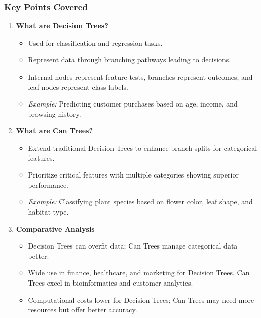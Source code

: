 \documentclass[aspectratio=169]{beamer}
\begin{document}
\begin{frame}[fragile]
    \frametitle{Key Points Covered}
    \begin{enumerate}
        \item \textbf{What are Decision Trees?}
            \begin{itemize}
                \item Used for classification and regression tasks.
                \item Represent data through branching pathways leading to decisions.
                \item Internal nodes represent feature tests, branches represent outcomes, and leaf nodes represent class labels.
                \item \textit{Example:} Predicting customer purchases based on age, income, and browsing history.
            \end{itemize}
        
        \item \textbf{What are Can Trees?}
            \begin{itemize}
                \item Extend traditional Decision Trees to enhance branch splits for categorical features.
                \item Prioritize critical features with multiple categories showing superior performance.
                \item \textit{Example:} Classifying plant species based on flower color, leaf shape, and habitat type.
            \end{itemize}

        \item \textbf{Comparative Analysis}
            \begin{itemize}
                \item Decision Trees can overfit data; Can Trees manage categorical data better.
                \item Wide use in finance, healthcare, and marketing for Decision Trees. Can Trees excel in bioinformatics and customer analytics.
                \item Computational costs lower for Decision Trees; Can Trees may need more resources but offer better accuracy.
            \end{itemize}
    \end{enumerate}
\end{frame}
\end{document}
